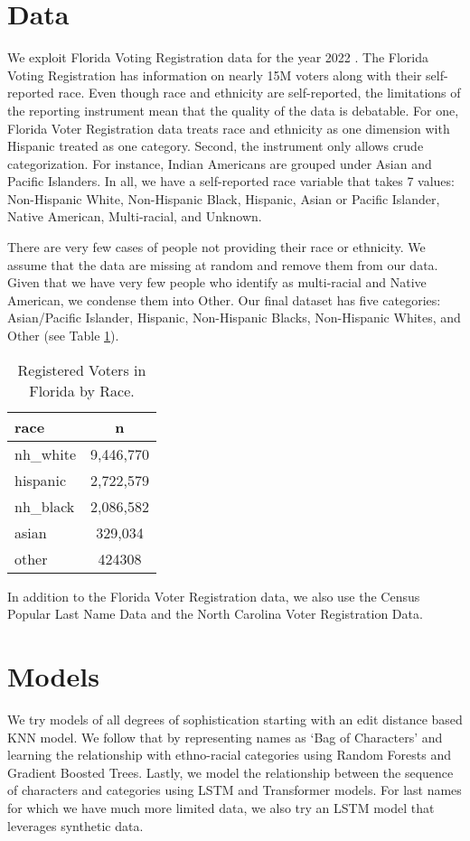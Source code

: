 \documentclass[12pt, letterpaper]{article}
\begin{document}
\section*{Data}
We exploit Florida Voting Registration data for the year 2022 \citep{sood_2017}. The Florida Voting Registration has information on nearly 15M voters along with their self-reported race. Even though race and ethnicity are self-reported, the limitations of the reporting instrument mean that the quality of the data is debatable. For one, Florida Voter Registration data treats race and ethnicity as one dimension with Hispanic treated as one category. Second, the instrument only allows crude categorization. For instance, Indian Americans are grouped under Asian and Pacific Islanders. In all, we have a self-reported race variable that takes 7 values: Non-Hispanic White, Non-Hispanic Black, Hispanic, Asian or Pacific Islander, Native American, Multi-racial, and Unknown. 

There are very few cases of people not providing their race or ethnicity. We assume that the data are missing at random and remove them from our data. Given that we have very few people who identify as multi-racial and Native American, we condense them into Other. Our final dataset has five categories: Asian/Pacific Islander, Hispanic, Non-Hispanic Blacks, Non-Hispanic Whites, and Other (see Table \ref{table:fl_data}). 

\begin{table}[h!]
\centering
\caption{Registered Voters in Florida by Race.}
\begin{tabular}{ l c }
\hline    
race & n \\
\hline
nh\_white  &       9,446,770 \\
hispanic   &       2,722,579 \\
nh\_black  &       2,086,582 \\
asian      &       329,034 \\
other      &       424308 \\
\hline
\end{tabular}
\label{table:fl_data}
\end{table}

In addition to the Florida Voter Registration data, we also use the Census Popular Last Name Data \citep{census2010} and the North Carolina Voter Registration Data. 

\section*{Models}
We try models of all degrees of sophistication starting with an edit distance based KNN model. We follow that by representing names as `Bag of Characters' and learning the relationship with ethno-racial categories using Random Forests and Gradient Boosted Trees. Lastly, we model the relationship between the sequence of characters and categories using LSTM and Transformer models. For last names for which we have much more limited data, we also try an LSTM model that leverages synthetic data. 
\end{document}

